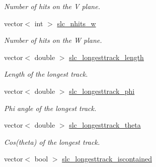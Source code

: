 \begin{DoxyCompactItemize}
\begin{DoxyCompactList}\small\item\em Number of hits on the V plane. \end{DoxyCompactList}\item 
\hypertarget{classUBXSecEvent_ac20d2a610a09c19bb6c10e80ec735b12}{vector$<$ int $>$ \hyperlink{classUBXSecEvent_ac20d2a610a09c19bb6c10e80ec735b12}{slc\-\_\-nhits\-\_\-w}}\label{classUBXSecEvent_ac20d2a610a09c19bb6c10e80ec735b12}

\begin{DoxyCompactList}\small\item\em Number of hits on the W plane. \end{DoxyCompactList}\item 
\hypertarget{classUBXSecEvent_ac3a7dd3d816188675925b73049cddc2a}{vector$<$ double $>$ \hyperlink{classUBXSecEvent_ac3a7dd3d816188675925b73049cddc2a}{slc\-\_\-longesttrack\-\_\-length}}\label{classUBXSecEvent_ac3a7dd3d816188675925b73049cddc2a}

\begin{DoxyCompactList}\small\item\em Length of the longest track. \end{DoxyCompactList}\item 
\hypertarget{classUBXSecEvent_a3d3b0be1ba8321dfa3f19fad27ae654c}{vector$<$ double $>$ \hyperlink{classUBXSecEvent_a3d3b0be1ba8321dfa3f19fad27ae654c}{slc\-\_\-longesttrack\-\_\-phi}}\label{classUBXSecEvent_a3d3b0be1ba8321dfa3f19fad27ae654c}

\begin{DoxyCompactList}\small\item\em Phi angle of the longest track. \end{DoxyCompactList}\item 
\hypertarget{classUBXSecEvent_aa3f16db3a887ed53354cae2bb3de19cb}{vector$<$ double $>$ \hyperlink{classUBXSecEvent_aa3f16db3a887ed53354cae2bb3de19cb}{slc\-\_\-longesttrack\-\_\-theta}}\label{classUBXSecEvent_aa3f16db3a887ed53354cae2bb3de19cb}

\begin{DoxyCompactList}\small\item\em Cos(theta) of the longest track. \end{DoxyCompactList}\item 
\hypertarget{classUBXSecEvent_a2e715c70dcf023fddf77ef56c85d01cf}{vector$<$ bool $>$ \hyperlink{classUBXSecEvent_a2e715c70dcf023fddf77ef56c85d01cf}{slc\-\_\-longesttrack\-\_\-iscontained}}\label{classUBXSecEvent_a2e715c70dcf023fddf77ef56c85d01cf}


\end{DoxyCompactItemize}

